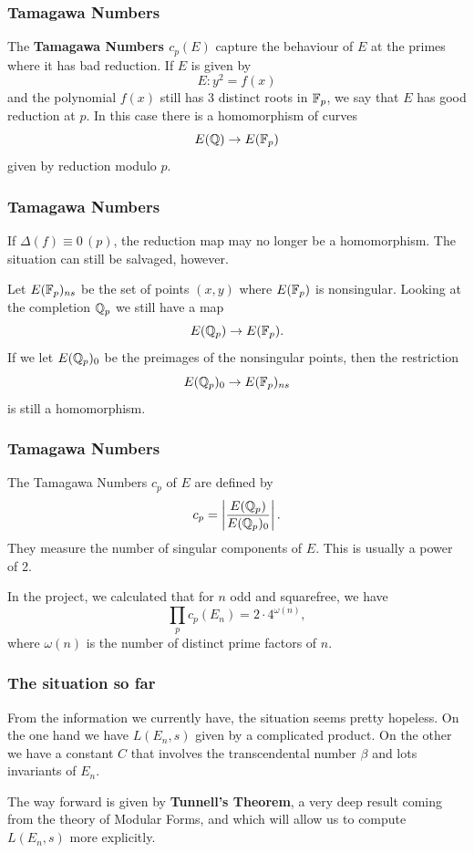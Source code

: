 \documentclass{beamer}
\begin{document}
\begin{frame}
  \frametitle{Tamagawa Numbers}
  The \textbf{Tamagawa Numbers $c_p(E)$} capture the behaviour of $E$ at the
  primes where it has bad reduction. If $E$ is given by
  \[E: y^2 = f(x)\]
  and the polynomial $f(x)$ still has 3 distinct roots in $\mathbb{F}_p$, we say that
  $E$ has good reduction at $p$. In this case there is a homomorphism of curves
  \[E({\mathbb Q}) \rightarrow E(\mathbb{F}_p)\]
  given by reduction modulo $p$.
\end{frame}

\begin{frame}
  \frametitle{Tamagawa Numbers}
  If $\Delta(f) \equiv 0 \, (p)$, the reduction map may no longer be a
  homomorphism. The situation
  can still be salvaged, however. \pause
  \bigskip

  Let $E(\mathbb{F}_p)_{ns}$ be the set of points $(x,y)$ where $E(\mathbb{F}_p)$ is
  nonsingular. Looking at the completion ${\mathbb Q}_p$ we still have a map
  \[E({\mathbb Q}_p) \rightarrow E(\mathbb{F}_p).\] \pause
  If we let $E({\mathbb Q}_p)_0$ be the preimages of the nonsingular points, then the
  restriction
  \[E({\mathbb Q}_p)_0 \rightarrow E(\mathbb{F}_p)_{ns}\]
  is still a homomorphism.
\end{frame}

\begin{frame}
  \frametitle{Tamagawa Numbers}
  The Tamagawa Numbers $c_p$ of $E$ are defined by
  \[c_p = \left| \frac{E({\mathbb Q}_p)}{E({\mathbb Q}_p)_0} \right|.\]
  They measure the number of singular components of $E$. This is usually a power
  of 2.\pause
  \bigskip

  \begin{theorem}
    In the project, we calculated that for $n$ odd and squarefree, we have
    \[\prod\limits_p c_p(E_n) = 2 \cdot 4^{\omega(n)},\]
    where $\omega(n)$ is the number of distinct prime factors of $n$.
  \end{theorem}

\end{frame}

\begin{frame}
  \frametitle{The situation so far}
  From the information we currently have, the situation seems pretty hopeless.
  On the one hand we have $L(E_n,s)$ given by a complicated product. On the
  other we have a constant $C$ that involves the transcendental number $\beta$
  and lots invariants of $E_n$. \pause
  \bigskip
  
  The way forward is given by \textbf{Tunnell's Theorem}, a very deep result
  coming from the theory of Modular Forms, and which will allow us to compute
  $L(E_n,s)$ more explicitly.
\end{frame}
\end{document}
